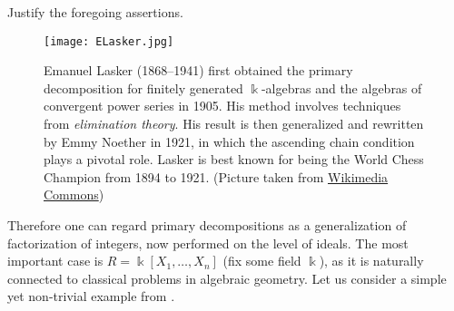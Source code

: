 \begin{exercise}
	Justify the foregoing assertions.
\end{exercise}

\begin{figure}[h]
	\centering \texttt{[image: ELasker.jpg]} \\ \vspace{1em}
	\begin{minipage}{0.7\textwidth}
		\small Emanuel Lasker (1868--1941) first obtained the primary decomposition for finitely generated $\Bbbk$-algebras and the algebras of convergent power series in 1905. His method involves techniques from \emph{elimination theory}. His result is then generalized and rewritten by Emmy Noether in 1921, in which the ascending chain condition plays a pivotal role. Lasker is best known for being the World Chess Champion from 1894 to 1921. (Picture taken from \href{https://commons.wikimedia.org/w/index.php?curid=5676713}{Wikimedia Commons})
	\end{minipage}
\end{figure}

Therefore one can regard primary decompositions as a generalization of factorization of integers, now performed on the level of ideals. The most important case is $R = \Bbbk[X_1, \ldots, X_n]$ (fix some field $\Bbbk$), as it is naturally connected to classical problems in algebraic geometry. Let us consider a simple yet non-trivial example from \cite[\S 3]{Eis95}.

